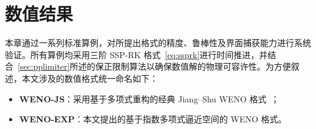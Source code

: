 \documentclass[12pt,a4paper]{article}
\numberwithin{equation}{section}    %
\begin{document}



\section{数值结果}

本章通过一系列标准算例，对所提出格式的精度、鲁棒性及界面捕获能力进行系统验证。所有算例均采用三阶 SSP-RK 格式~\eqref{eq:ssprk}进行时间推进，并结合~\autoref{sec:pplimiter}所述的保正限制算法以确保数值解的物理可容许性。为方便叙述，本文涉及的数值格式统一命名如下：
\begin{itemize}
    \item \textbf{WENO-JS}：采用基于多项式重构的经典 Jiang--Shu WENO 格式~\cite{JIANG1996202}；
    \item \textbf{WENO-EXP}：本文提出的基于指数多项式逼近空间的 WENO 格式。
\end{itemize}
\end{document}
